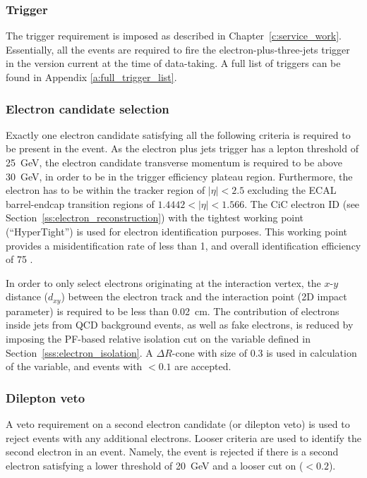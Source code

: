 \subsubsection*{Trigger}
The trigger requirement is imposed as described in Chapter~\ref{c:service_work}. Essentially, all the events are
required to fire the electron-plus-three-jets trigger in the version current at the time of data-taking. A full list of
triggers can be found in Appendix \ref{a:full_trigger_list}.

\subsubsection*{Electron candidate selection}
Exactly one electron candidate satisfying all the following criteria is required to be present in the event. As the
electron plus jets trigger has a lepton \pt threshold of \SI{25}{\GeV}, the electron candidate transverse momentum is
required to be above \SI{30}{\GeV}, in order to be in the trigger efficiency plateau region. Furthermore, the electron
has to be within the tracker region of $|\eta| < 2.5$ excluding the ECAL barrel-endcap transition regions of $1.4442 <
|\eta| < 1.566$. The CiC electron ID (see Section~\ref{ss:electron_reconstruction}) with the tightest working point
(``HyperTight'') is used for electron identification purposes. This working point provides a misidentification rate of
less than \SI{1}{\pc}, and overall identification efficiency of \SI{75}{\pc} \autocite{CiC_ID}.

In order to only select electrons originating at the interaction vertex, the $x$-$y$ distance ($d_{xy}$) between the
electron track and the interaction point (2D impact parameter) is required to be less than \SI{0.02}{\cm}. The
contribution of electrons inside jets from QCD background events, as well as fake electrons, is reduced by imposing the
PF-based relative isolation cut on the variable \reliso defined in Section~\ref{sss:electron_isolation}. A $\Delta
R$-cone with size of \num{0.3} is used in calculation of the \reliso variable, and events with \reliso $< 0.1$ are
accepted.

\subsubsection*{Dilepton veto}
A veto requirement on a second electron candidate (or dilepton veto) is used to reject events with any additional
electrons. Looser criteria are used to identify the second electron in an event. Namely, the event is rejected if there
is a second electron satisfying a lower \ET threshold of \SI{20}{\GeV} and a looser cut on \reliso ($<0.2$).

